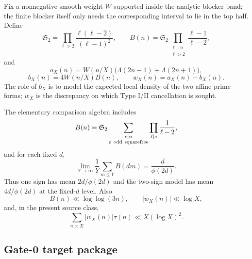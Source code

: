 \documentclass[11pt]{article}
\theoremstyle{definition}
\newcommand{\1}{\mathbf 1}
\begin{document}
Fix a nonnegative smooth weight $W$ supported inside the analytic blocker band; the
finite blocker itself only needs the corresponding interval to lie in the top half.
Define
\[
\mathfrak S_2
=
\prod_{\ell>2}\frac{\ell(\ell-2)}{(\ell-1)^2},
\qquad
B(n)
=
\mathfrak S_2
\prod_{\substack{\ell\mid n\\\ell>2}}
\frac{\ell-1}{\ell-2},
\]
and
\[
\boxed{
a_X(n)
=
W(n/X)\bigl(\Lambda(2n-1)+\Lambda(2n+1)\bigr),
}
\]
\[
\boxed{
b_X(n)=4W(n/X)B(n),\qquad
w_X(n)=a_X(n)-b_X(n).
}
\tag{G0-source}
\]
The role of $b_X$ is to model the expected local density of the two affine prime forms;
$w_X$ is the discrepancy on which Type I/II cancellation is sought.

The elementary comparison algebra includes
\[
B(n)
=
\mathfrak S_2
\sum_{\substack{e\mid n\\e\ {\rm odd\ squarefree}}}
\prod_{\ell\mid e}\frac1{\ell-2},
\]
and for each fixed $d$,
\[
\lim_{Y\to\infty}
\frac1Y\sum_{m\le Y}B(dm)
=
\frac{d}{\phi(2d)}.
\tag{G0-Bmean}
\]
Thus one sign has mean $2d/\phi(2d)$ and the two-sign model has mean
$4d/\phi(2d)$ at the fixed-$d$ level.  Also
\[
B(n)\ll\log\log(3n),\qquad
|w_X(n)|\ll\log X,
\]
and, in the present source class,
\[
\sum_{n\asymp X}|w_X(n)|\tau(n)\ll X(\log X)^2.
\tag{G0-growth}
\]

\subsection{Gate-0 target package}
\end{document}
